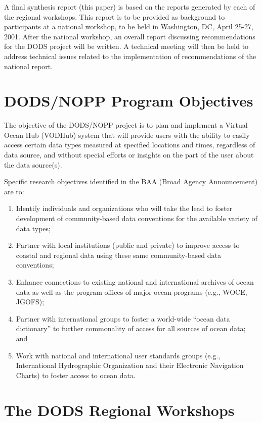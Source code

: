 \documentclass{report}
\begin{document}
A final synthesis report (this paper) is based on the reports
generated by each of the regional workshops.  This report is to be
provided as background to participants at a national workshop, to
be held in Washington, DC, April 25-27, 2001.  After the national
workshop, an overall report discussing recommendations for the DODS
project will be written.  A technical meeting will then be held to
address technical issues related to the implementation of
recommendations of the national report.

\chapter{DODS/NOPP Program Objectives}

The objective of the DODS/NOPP project is to plan and implement a
Virtual Ocean Hub (VODHub) system that will provide users with the
ability to easily access certain data types measured at specified
locations and times, regardless of data source, and without special
efforts or insights on the part of the user about the data source(s).

Specific research objectives identified in the BAA (Broad Agency
Announcement) are to:

\begin{enumerate}
\item Identify individuals and organizations who will take the lead to
  foster development of community-based data conventions for the
  available variety of data types;
\item Partner with local institutions (public and private) to improve
  access to coastal and regional data using these same community-based
  data conventions;
\item Enhance connections to existing national and international
  archives of ocean data as well as the program offices of major ocean
  programs (e.g., WOCE, JGOFS);
\item Partner with international groups to foster a world-wide ``ocean
  data dictionary'' to further commonality of access for all sources
  of ocean data; and
\item Work with national and international user standards groups
  (e.g., International Hydrographic Organization and their Electronic
  Navigation Charts) to foster access to ocean data.
\end{enumerate}

\chapter{The DODS Regional Workshops}
\end{document}

